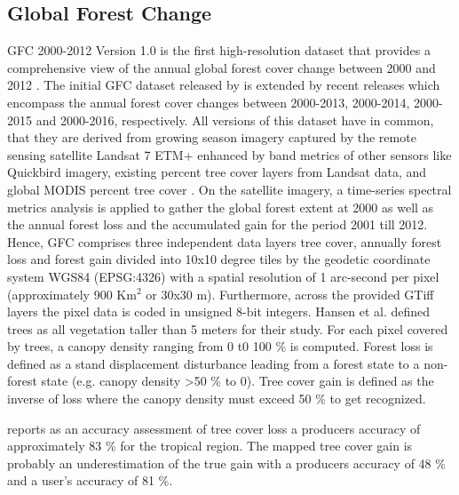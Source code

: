 	\subsection{Global Forest Change}
		\ac{GFC} 2000-2012 Version 1.0 is the first high-resolution dataset that provides a comprehensive view of the annual global forest cover change between 2000 and 2012 \citep{Hansen2013, Li2017}. The initial \ac{GFC} dataset released by \citeauthor{Hansen2013} is extended by recent releases which encompass the annual forest cover changes between 2000-2013, 2000-2014, 2000-2015 and 2000-2016, respectively. All versions of this dataset have in common, that they are derived from growing season imagery captured by the remote sensing satellite Landsat 7 \ac{ETM+} enhanced by band metrics of other sensors like Quickbird imagery, existing percent tree cover layers from Landsat data, and global \ac{MODIS} percent tree cover \citep{Hansen2013}. On the satellite imagery, a time-series spectral metrics analysis is applied to gather the global forest extent at 2000 as well as the annual forest loss and the accumulated gain for the period 2001 till 2012. Hence, \ac{GFC} comprises three independent data layers tree cover, annually forest loss and forest gain divided into 10x10 degree tiles by the geodetic coordinate system \ac{WGS84} (EPSG:4326) with a spatial resolution of 1 arc-second per pixel (approximately 900 Km$^2$ or 30x30 m). Furthermore, across the provided \ac{GTiff} layers the pixel data is coded in unsigned 8-bit integers. Hansen et al. defined trees as all vegetation taller than 5 meters for their study. For each pixel covered by trees, a canopy density ranging from 0 t0 100 \% is computed. Forest loss is defined as a stand displacement disturbance leading from a forest state to a non-forest state (e.g. canopy density >50 \% to 0). Tree cover gain is defined as the inverse of loss where the canopy density must exceed 50 \% to get recognized.

		\citeauthor{Hansen2013} reports as an accuracy assessment of tree cover loss a producers accuracy of approximately 83 \% for the tropical region. The mapped tree cover gain is probably an underestimation of the true gain with a producers accuracy of 48 \% and a user's accuracy of 81 \%. 

